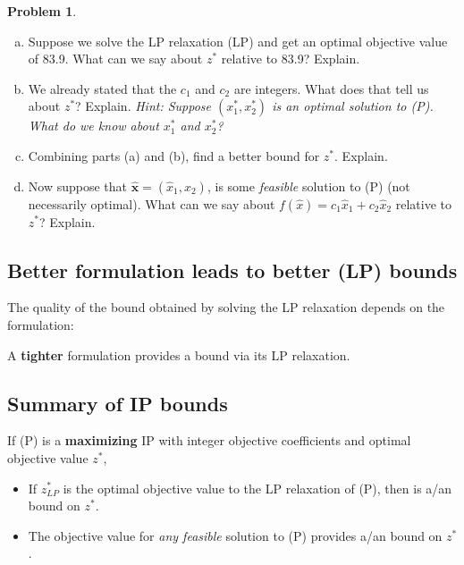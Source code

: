 \documentclass[11pt]{article}
\theoremstyle{definition}
\newtheorem{problem}{Problem}
\newcommand{\answerbox}[3]{%
  \fbox{%
    \begin{minipage}[#1]{#2}
      \hfill\vspace{#3}
    \end{minipage}
  }
}
\newcommand{\answerboxone}[2]{%
  \answerbox{#1}{6.0in}{#2} 
}
\newcommand{\wordbox}{\answerbox{c}{1.2in}{.7cm}}
\newcommand{\catbox}{\answerbox{c}{.5in}{.7cm}}
\begin{document}
\begin{problem}
\begin{enumerate}[(a)]
\item    Suppose we solve the LP relaxation (LP) and get an optimal objective value of 83.9.  What can we say about $z^*$ relative to 83.9?  Explain.

\answerboxone{c}{1in}

\item We already stated that the $c_1$ and $c_2$ are integers.  What does that tell us about $z^*$?  Explain.  \emph{Hint:  Suppose $(x^*_1, x^*_2)$ is an optimal solution to (P).  What do we know about $x^*_1$ and  $x^*_2$?}

\answerboxone{c}{1in}

\item  Combining parts (a) and (b), find a better bound for $z^*$.  Explain.

\answerboxone{c}{1in}

\item  Now suppose that $\hat{\mathbf{x}} = (\hat{x}_1, \hat{x}_2)$, is some \emph{feasible} solution to (P) (not necessarily optimal).  What can we say about $f(\hat{x}) =  c_1 \hat{x}_1 + c_2 \hat{x}_2$ relative to $z^*$?  Explain.

\answerboxone{c}{1in}
\end{enumerate}
\end{problem}

\subsection{Better formulation leads to better (LP) bounds}

The quality of the bound obtained by solving the LP relaxation depends on the formulation:
\begin{center} 
A \textbf{tighter} formulation provides a \wordbox bound via its LP relaxation.
\end{center}

\subsection{Summary of IP bounds}

\begin{tcolorbox}
If (P) is a \textbf{maximizing} IP with integer objective coefficients and optimal objective value $z^*$,
\begin{itemize}
\item  If $z^*_{LP}$ is the optimal objective value to the LP relaxation of (P), then \catbox is a/an \wordbox bound on $z^*$.
\item  The objective value for \emph{any feasible} solution to (P) provides a/an \wordbox bound on $z^*$.
\end{itemize}
\end{tcolorbox}
\end{document}
